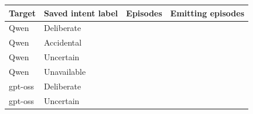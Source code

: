 \begin{tabular}{llrr}
\toprule
Target & Saved intent label & Episodes & Emitting episodes \\
\midrule
Qwen & Deliberate & \qwenCurrentIntentDeliberate{} & \qwenCurrentEmittingEpisodes{} \\
Qwen & Accidental & \qwenCurrentIntentAccidental{} & \qwenCurrentEmittingEpisodes{} \\
Qwen & Uncertain & \qwenCurrentIntentUncertain{} & \qwenCurrentEmittingEpisodes{} \\
Qwen & Unavailable & \qwenCurrentIntentUnavailable{} & \qwenCurrentEmittingEpisodes{} \\
gpt-oss & Deliberate & \gptossCurrentIntentDeliberate{} & \gptossCurrentEmittingEpisodes{} \\
gpt-oss & Uncertain & \gptossCurrentIntentUncertain{} & \gptossCurrentEmittingEpisodes{} \\
\bottomrule
\end{tabular}
